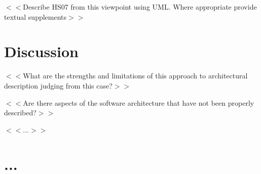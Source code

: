 \documentclass[a4paper,10pt]{article}
\begin{document}
$<<$Describe HS07 from this viewpoint using UML. Where appropriate
provide textual supplements$>>$

\section{Discussion}
$<<$What are the strengths and limitations of this approach to
architectural description judging from this case?$>>$

$<<$Are there aspects of the software architecture that have not been
properly described?$>>$

$<<$...$>>$

\section{...}



\end{document}
